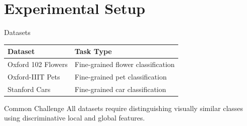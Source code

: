
\section{Experimental Setup}

\begin{frame}{Datasets}
  \small
  \begin{table}
    \centering
    \begin{tabular}{ll}
      \toprule
      \textbf{Dataset} & \textbf{Task Type} \\
      \midrule
      Oxford 102 Flowers & Fine-grained flower classification \\
      Oxford-IIIT Pets & Fine-grained pet classification \\
      Stanford Cars & Fine-grained car classification \\
      \bottomrule
    \end{tabular}
  \end{table}

  \vspace{0.3cm}

  \begin{alertblock}{Common Challenge}
    All datasets require distinguishing visually similar classes using discriminative local and global features.
  \end{alertblock}
\end{frame}

